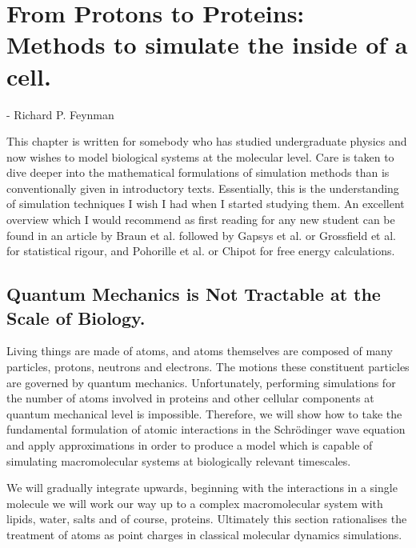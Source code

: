 \chapter{From Protons to Proteins: Methods to simulate the inside of a cell.}

\label{chap:methods}

  {- Richard P. Feynman \cite{feynman1982}}

This chapter is written for somebody who has studied undergraduate physics and now wishes to model biological systems at the molecular level. Care is taken to dive deeper into the mathematical formulations of simulation methods than is conventionally given in introductory texts. Essentially, this is the understanding of simulation techniques I wish I had when I started studying them. An excellent overview which I would recommend as first reading for any new student can be found in an article by Braun et al. \cite{braun2019} followed by Gapsys et al. \cite{gapsys2020} or Grossfield et al. \cite{grossfield2019} for statistical rigour, and Pohorille et al. \cite{pohorille2010} or Chipot \cite{chipot2007} for free energy calculations.  

\section{Quantum Mechanics is Not Tractable at the Scale of Biology.}
Living things are made of atoms, and atoms themselves are composed of many particles, protons, neutrons and electrons. The motions these constituent particles are governed by quantum mechanics. Unfortunately, performing simulations for the number of atoms involved in proteins and other cellular components at quantum mechanical level is impossible. Therefore, we will show how to take the fundamental formulation of atomic interactions in the Schr\"{o}dinger wave equation and apply approximations in order to produce a model which is capable of simulating macromolecular systems at biologically relevant timescales. 

We will gradually integrate upwards, beginning with the interactions in a single molecule we will work our way up to a complex macromolecular system with lipids, water, salts and of course, proteins. Ultimately this section rationalises the treatment of atoms as point charges in classical molecular dynamics simulations. 

